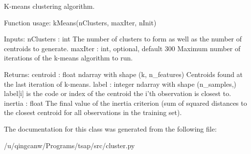 \begin{DoxyVerb}K-means clustering algorithm.

Function usage: kMeans(nClusters, maxIter, nInit)

Inputs:
nClusters : int
    The number of clusters to form as well as the number of
    centroids to generate.
maxIter : int, optional, default 300
    Maximum number of iterations of the k-means algorithm to run.

Returns:
centroid :  float ndarray with shape (k, n_features)
    Centroids found at the last iteration of k-means.
label : integer ndarray with shape (n_samples,)
    label[i] is the code or index of the centroid the i’th
    observation is closest to.
inertia : float
    The final value of the inertia criterion (sum of squared
    distances to the closest centroid for all observations
    in the training set).\end{DoxyVerb}
 

The documentation for this class was generated from the following file\+:\begin{DoxyCompactItemize}
\item 
/u/qingcanw/\+Programs/tsap/src/cluster.\+py\end{DoxyCompactItemize}
